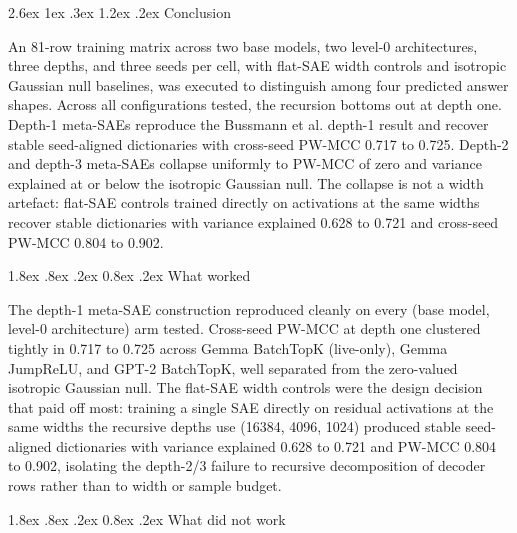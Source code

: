 \documentclass[conference]{IEEEtran}
\makeatletter
\renewcommand\section{\@startsection{section}{1}{\z@}%
   {2.6ex \@plus 1ex \@minus .3ex}%
   {1.2ex \@plus .2ex}%
   {\normalfont\Large\bfseries\centering}}
\renewcommand\subsection{\@startsection{subsection}{2}{\z@}%
   {1.8ex \@plus .8ex \@minus .2ex}%
   {0.8ex \@plus .2ex}%
   {\normalfont\large\bfseries}}
\makeatother
\begin{document}
\hypertarget{conclusion}{%
\section{Conclusion}\label{conclusion}}

An 81-row training matrix across two base models, two level-0
architectures, three depths, and three seeds per cell, with flat-SAE
width controls and isotropic Gaussian null baselines, was executed to
distinguish among four predicted answer shapes. Across all
configurations tested, the recursion bottoms out at depth one. Depth-1
meta-SAEs reproduce the Bussmann et al.
\autocite{bussmann2024showingsaeslearn} depth-1 result and recover
stable seed-aligned dictionaries with cross-seed PW-MCC 0.717 to 0.725.
Depth-2 and depth-3 meta-SAEs collapse uniformly to PW-MCC of zero and
variance explained at or below the isotropic Gaussian null. The collapse
is not a width artefact: flat-SAE controls trained directly on
activations at the same widths recover stable dictionaries with variance
explained 0.628 to 0.721 and cross-seed PW-MCC 0.804 to 0.902.

\hypertarget{what-worked}{%
\subsection{What worked}\label{what-worked}}

The depth-1 meta-SAE construction reproduced cleanly on every (base
model, level-0 architecture) arm tested. Cross-seed PW-MCC at depth one
clustered tightly in 0.717 to 0.725 across Gemma BatchTopK (live-only),
Gemma JumpReLU, and GPT-2 BatchTopK, well separated from the zero-valued
isotropic Gaussian null. The flat-SAE width controls were the design
decision that paid off most: training a single SAE directly on residual
activations at the same widths the recursive depths use (16384, 4096,
1024) produced stable seed-aligned dictionaries with variance explained
0.628 to 0.721 and PW-MCC 0.804 to 0.902, isolating the depth-2/3
failure to recursive decomposition of decoder rows rather than to width
or sample budget.

\hypertarget{what-did-not-work}{%
\subsection{What did not work}\label{what-did-not-work}}
\end{document}
